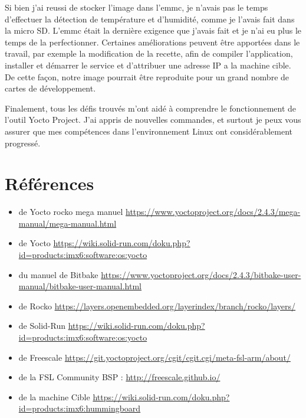 \documentclass[letterpaper,10pt,french]{sphinxmanual}
\begin{document}
Si bien j'ai reussi de stocker l'image dans l'emmc, je n'avais pas le temps d'effectuer la détection de température et d'humidité, comme je l'avais fait dans la micro SD. L'emmc était la dernière exigence que j'avais fait et je n'ai eu plus le temps de la perfectionner. Certaines améliorations peuvent être apportées dans le travail, par exemple la modification de la recette, afin de compiler l'application, installer et démarrer le service et d’attribuer une adresse IP a la machine cible. De cette façon, notre image pourrait être reproduite pour un grand nombre de cartes de développement.

Finalement, tous les défis trouvés m'ont aidé à comprendre le fonctionnement de l'outil Yocto Project. J'ai appris de nouvelles commandes, et surtout je peux vous assurer que mes compétences dans l'environnement Linux ont considérablement progressé.


\chapter{Références}
\label{references::doc}\label{references:references}\begin{itemize}
\item {} 
de Yocto rocko mega manuel \href{https://www.yoctoproject.org/docs/2.4.3/mega-manual/mega-manual.html}{https://www.yoctoproject.org/docs/2.4.3/mega-manual/mega-manual.html}

\item {} 
de Yocto \href{https://wiki.solid-run.com/doku.php?id=products:imx6:software:os:yocto}{https://wiki.solid-run.com/doku.php?id=products:imx6:software:os:yocto}

\item {} 
du manuel de Bitbake \href{https://www.yoctoproject.org/docs/2.4.3/bitbake-user-manual/bitbake-user-manual.html}{https://www.yoctoproject.org/docs/2.4.3/bitbake-user-manual/bitbake-user-manual.html}

\item {} 
de Rocko \href{https://layers.openembedded.org/layerindex/branch/rocko/layers/}{https://layers.openembedded.org/layerindex/branch/rocko/layers/}

\item {} 
de Solid-Run \href{https://wiki.solid-run.com/doku.php?id=products:imx6:software:os:yocto}{https://wiki.solid-run.com/doku.php?id=products:imx6:software:os:yocto}

\item {} 
de Freescale \href{https://git.yoctoproject.org/cgit/cgit.cgi/meta-fsl-arm/about/}{https://git.yoctoproject.org/cgit/cgit.cgi/meta-fsl-arm/about/}

\item {} 
de la FSL Community BSP : \href{http://freescale.github.io/}{http://freescale.github.io/}

\item {} 
de la machine Cible \href{https://wiki.solid-run.com/doku.php?id=products:imx6:hummingboard}{https://wiki.solid-run.com/doku.php?id=products:imx6:hummingboard}

\end{itemize}



\renewcommand{\indexname}{Index}
\printindex
\end{document}
